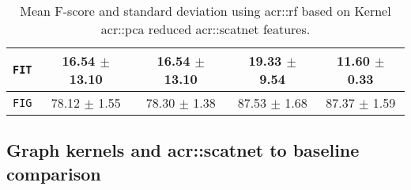 \begin{table}[htbp]
\begin{tabular}{| c | c c | c c |}
                    \hline
                    \texttt{FIT} & 16.54 \(\pm\) 13.10 & 16.54 \(\pm\) 13.10 & 19.33 \(\pm\) 9.54 & 11.60 \(\pm\) 0.33 \\
                    \hline
                    \texttt{FIG} & 78.12 \(\pm\) 1.55 & 78.30 \(\pm\) 1.38 & 87.53 \(\pm\) 1.68 & 87.37 \(\pm\) 1.59 \\
                    \hline
                \end{tabular}
                \caption{
                    \label{tab::f_score_rf_scat_kpca_f3}
                    Mean F-score and standard deviation using \gls{acr::rf} based on Kernel \gls{acr::pca} reduced \gls{acr::scatnet} features.
                }
            \end{table}


    \subsection{Graph kernels and \texorpdfstring{\acrshort*{acr::scatnet}}{ScatNet} to baseline comparison}
